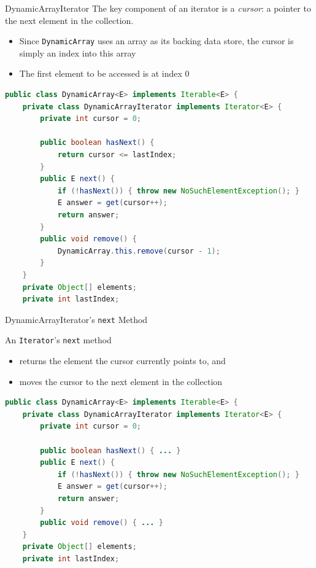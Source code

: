 \documentclass{beamer}
\begin{document}
\begin{frame}[fragile]{DynamicArrayIterator}
\vspace{-.05in}
The key component of an iterator is a {\it cursor}: a pointer to the next element in the collection.
\vspace{-.05in}
\begin{itemize}
\item Since {\tt DynamicArray} uses an array as its backing data store, the cursor is simply an index into this array
\item The first element to be accessed is at index 0
\end{itemize}
\vspace{-.05in}
\begin{lstlisting}[language=Java]
public class DynamicArray<E> implements Iterable<E> {
    private class DynamicArrayIterator implements Iterator<E> {
        private int cursor = 0;

        public boolean hasNext() {
            return cursor <= lastIndex;
        }
        public E next() {
            if (!hasNext()) { throw new NoSuchElementException(); }
            E answer = get(cursor++);
            return answer;
        }
        public void remove() {
            DynamicArray.this.remove(cursor - 1);
        }
    }
    private Object[] elements;
    private int lastIndex;
\end{lstlisting}

\end{frame}

\begin{frame}[fragile]{DynamicArrayIterator's {\tt next} Method}

An {\tt Iterator}'s {\tt next} method

\begin{itemize}
\item returns the element the cursor currently points to, and
\item moves the cursor to the next element in the collection
\end{itemize}

\begin{lstlisting}[language=Java]
public class DynamicArray<E> implements Iterable<E> {
    private class DynamicArrayIterator implements Iterator<E> {
        private int cursor = 0;

        public boolean hasNext() { ... }
        public E next() {
            if (!hasNext()) { throw new NoSuchElementException(); }
            E answer = get(cursor++);
            return answer;
        }
        public void remove() { ... }
    }
    private Object[] elements;
    private int lastIndex;
\end{lstlisting}

\end{frame}
\end{document}

